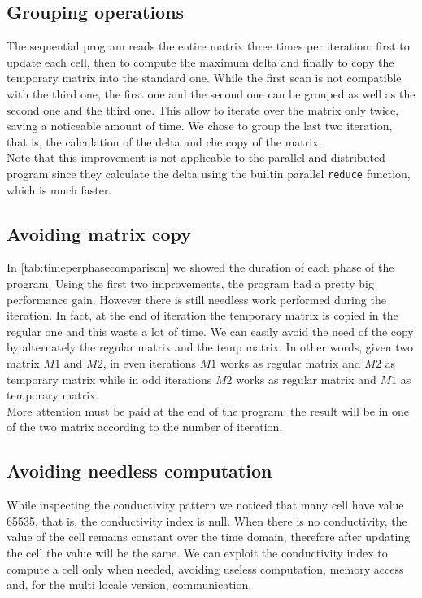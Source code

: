 \documentclass{article}
\begin{document}
\subsection{Grouping operations}
The sequential program reads the entire matrix three times per iteration: first to update each cell, then to compute the maximum delta and finally to copy the temporary matrix into the standard one. While the first scan is not compatible with the third one, the first one and the second one can be grouped as well as the second one and the third one. This allow to iterate over the matrix only twice, saving a noticeable amount of time. We chose to group the last two iteration, that is, the calculation of the delta and che copy of the matrix. \\
Note that this improvement is not applicable to the parallel and distributed program since they calculate the delta using the builtin parallel \texttt{reduce} function, which is much faster.

\subsection{Avoiding matrix copy}
In \autoref{tab:timeperphasecomparison} we showed the duration of each phase of the program. Using the first two improvements, the program had a pretty big performance gain. However there is still needless work performed during the iteration. In fact, at the end of iteration the temporary matrix is copied in the regular one and this waste a lot of time. We can easily avoid the need of the copy by alternately the regular matrix and the temp matrix. In other words, given two matrix $M1$ and $M2$, in even iterations $M1$ works as regular matrix and $M2$ as temporary matrix while in odd iterations $M2$ works as regular matrix and $M1$ as temporary matrix. \\
More attention must be paid at the end of the program: the result will be in one of the two matrix according to the number of iteration.

\subsection{Avoiding needless computation}
While inspecting the conductivity pattern we noticed that many cell have value 65535, that is, the conductivity index is null. When there is no conductivity, the value of the cell remains constant over the time domain, therefore after updating the cell the value will be the same. We can exploit the conductivity index to compute a cell only when needed, avoiding useless computation, memory access and, for the multi locale version, communication.
\end{document}
